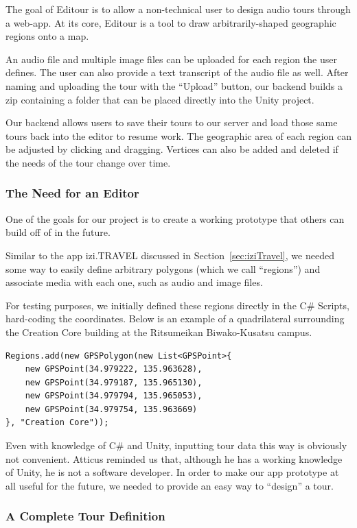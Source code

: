 \documentclass[a4paper, 10pt, american, titlepage]{article}
\begin{document}
The goal of Editour is to allow a non-technical user to design audio tours
through a web-app. At its core, Editour is a tool to draw arbitrarily-shaped
geographic regions onto a map.

An audio file and multiple image files can be uploaded for each region the user
defines. The user can also provide a text transcript of the audio file as well.
After naming and uploading the tour with the ``Upload'' button, our backend
builds a zip containing a folder that can be placed directly into the Unity
project.

Our backend allows users to save their tours to our server and load those same
tours back into the editor to resume work.  The geographic area of each region
can be adjusted by clicking and dragging. Vertices can also be added and
deleted if the needs of the tour change over time.

\subsubsection{The Need for an Editor}

One of the goals for our project is to create a working prototype that others
can build off of in the future.

Similar to the app izi.TRAVEL discussed in Section~\ref{sec:iziTravel}, we
needed some way to easily define arbitrary polygons (which we call ``regions'')
and associate media with each one, such as audio and image files.

For testing purposes, we initially defined these regions directly in the C\#
Scripts, hard-coding the coordinates. Below is an example of a quadrilateral
surrounding the Creation Core building at the Ritsumeikan Biwako-Kusatsu campus.

\begin{verbatim}
Regions.add(new GPSPolygon(new List<GPSPoint>{
    new GPSPoint(34.979222, 135.963628),
    new GPSPoint(34.979187, 135.965130),
    new GPSPoint(34.979794, 135.965053),
    new GPSPoint(34.979754, 135.963669)
}, "Creation Core"));
\end{verbatim}

Even with knowledge of C\# and Unity, inputting tour data this way is obviously
not convenient. Atticus reminded us that, although he has a working knowledge of
Unity, he is not a software developer. In order to make our app prototype at all
useful for the future, we needed to provide an easy way to ``design'' a tour.

\subsubsection{A Complete Tour Definition}
\label{sec:tourDefinition}
\end{document}
